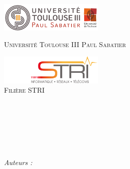 %
\begin{titlepage}
    \begin{center}
        \begin{minipage}[t]{0.48\textwidth}
            \begin{flushleft}
                \includegraphics [width=50mm]{images/logo-univ.png}
                \\[0.7cm]
                \begin{spacing}{1.3}
                    \textsc{\LARGE Université Toulouse III Paul Sabatier}
                \end{spacing}
            \end{flushleft}
        \end{minipage}
        \begin{minipage}[t]{0.48\textwidth}
            \begin{flushright}
                \includegraphics [width=50mm]{images/logo-stri.png}
                \\[0.7cm]
                \textsc{\LARGE Filière STRI}
            \end{flushright}
        \end{minipage}
        \\[3.7cm]
        \textsc{\Large \reportsubject}\\[0.7cm]
        \HRule \\[0.7cm]
        {\huge \bfseries \reporttitle}\\[0.7cm]
        \HRule \\[7.5cm]
        \begin{flushleft} \large
            \emph{Auteurs :}\\
            \reportauthor
        \end{flushleft}
        \vfill
        {\large \reportdate}
    \end{center}
%
\end{titlepage}
